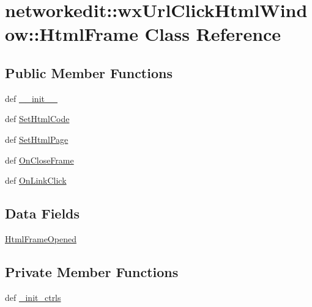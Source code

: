 \hypertarget{classnetworkedit_1_1wxUrlClickHtmlWindow_1_1HtmlFrame}{
\section{networkedit::wx\-Url\-Click\-Html\-Window::Html\-Frame Class Reference}
\label{classnetworkedit_1_1wxUrlClickHtmlWindow_1_1HtmlFrame}
}
\subsection*{Public Member Functions}
\begin{CompactItemize}
\item 
def \hyperlink{classnetworkedit_1_1wxUrlClickHtmlWindow_1_1HtmlFrame_84dbbfa164b9bfc3867064ef8ddc825c}{\_\-\_\-init\_\-\_\-}
\item 
def \hyperlink{classnetworkedit_1_1wxUrlClickHtmlWindow_1_1HtmlFrame_0d46d44545dff5c49ee702dce0ca58a7}{Set\-Html\-Code}
\item 
def \hyperlink{classnetworkedit_1_1wxUrlClickHtmlWindow_1_1HtmlFrame_4facc9fa00032db7ca18302a09300a15}{Set\-Html\-Page}
\item 
def \hyperlink{classnetworkedit_1_1wxUrlClickHtmlWindow_1_1HtmlFrame_300490430ca9c68ffff6f1ce4f9cff66}{On\-Close\-Frame}
\item 
def \hyperlink{classnetworkedit_1_1wxUrlClickHtmlWindow_1_1HtmlFrame_efef756beaf2cecc502b2f6c3c5386cb}{On\-Link\-Click}
\end{CompactItemize}
\subsection*{Data Fields}
\begin{CompactItemize}
\item 
\hyperlink{classnetworkedit_1_1wxUrlClickHtmlWindow_1_1HtmlFrame_14f29033b3eec5b120495b5c24050939}{Html\-Frame\-Opened}
\end{CompactItemize}
\subsection*{Private Member Functions}
\begin{CompactItemize}
\item 
def \hyperlink{classnetworkedit_1_1wxUrlClickHtmlWindow_1_1HtmlFrame_2930185c7e28e2386998fba908fde7c8}{\_\-init\_\-ctrls}
\end{CompactItemize}


